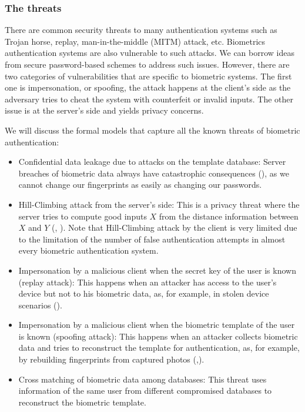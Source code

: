 \subsubsection{The threats}
\label{sec:privacyReqs}
There are common security threats to many authentication systems such as Trojan horse, replay, man-in-the-middle (MITM)
attack, etc. Biometrics authentication systems are also vulnerable to such attacks. We can
borrow ideas from secure password-based schemes to address such issues. However, there are two categories of
vulnerabilities that are specific to biometric systems.  The first one is impersonation, or spoofing, the attack happens
at the client's side as the adversary tries to cheat the system with counterfeit or invalid inputs.  The other issue is
at the server's side and yields privacy concerns.

We will discuss the formal models that capture all the known threats of biometric authentication:
\begin{itemize}
\item Confidential data leakage due to attacks on the template database: Server breaches of biometric data always have
  catastrophic consequences (\cite{OPMsays563:online}), as we cannot change our fingerprints as easily as changing our
  passwords.
\item Hill-Climbing attack from the server's side: This is a privacy threat where the server tries to compute good
  inputs $X$ from the distance information between $X$ and $Y$ (\cite{uludag2004attacks}, \cite{higo2015privacy}). Note
  that Hill-Climbing attack by the client is very limited due to the limitation of the number of false authentication
  attempts in almost every biometric authentication system.
\item Impersonation by a malicious client when the secret key of the user is known (replay attack): This happens when an
  attacker has access to the user's device but not to his biometric data, as, for example, in stolen device
  scenarios (\cite{zhang2015fingerprints}).
\item Impersonation by a malicious client when the biometric template of the user is known (spoofing attack): This happens
  when an attacker collects biometric data and tries to reconstruct the template for authentication, as, for example, by
  rebuilding fingerprints from captured photos (\cite{zhang2015fingerprints},\cite{feng2011fingerprint}).
\item Cross matching of biometric data among databases: This threat uses information of the same user from different
  compromised databases to reconstruct the biometric template.
\end{itemize}

